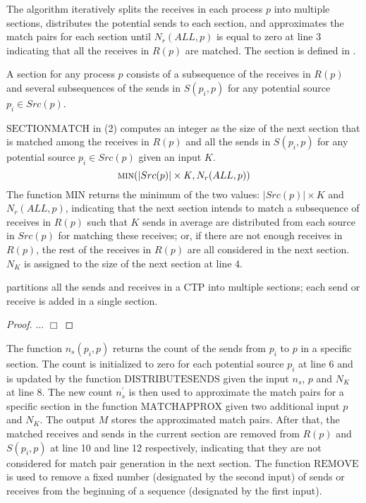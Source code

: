 The algorithm iteratively splits the receives in each process $p$ into multiple sections, distributes the potential sends to each section, and approximates the match pairs for each section until $N_r(ALL,p)$ is equal to zero at line 3 indicating that all the receives in $R(p)$ are matched.  The section is defined in .

\begin{definition}
A section for any process $p$ consists of a subsequence of the receives in $R(p)$ and several subsequences of the sends in $S(p_i,p)$ for any potential source $p_i\in Src(p)$.
\label{def:section}
\end{definition}

$\mathrm{SECTIONMATCH}$ in (2) computes an integer as the size of the next section that is matched among the receives in $R(p)$ and all the sends in $S(p_{i},p)$ for any potential source $p_{i}\in Src(p)$ 
given an input $K$. 
\begin{equation}
\Call{min}{|Src(p)|\times\mathit{K}, N_r(ALL,p)}
\end{equation}
The function $\mathrm{MIN}$ returns the minimum of the two values: $|Src(p)|\times\mathit{K}$ and $ N_r(ALL,p)$, indicating that the next section intends to match a subsequence of receives in $R(p)$ such that $K$ sends in average are distributed from each source in $Src(p)$ for matching these receives; or, if there are not enough receives in $R(p)$, the rest of the receives in $R(p)$ are all considered in the next section. $N_K$ is assigned to the size of the next section at line 4. 

\begin{lemma}
 partitions all the sends and receives in a CTP into multiple sections; each send or receive is added in a single section.
\end{lemma}
\begin{proof}
... 
$\Box$
\end{proof}

The function $\mathit{n_s}(p_{i},p)$ returns the count of the  sends from $p_i$ to $p$ in a specific section. The count is initialized to zero for each potential source $p_i$ at line 6 and is updated by the function $\mathrm{DISTRIBUTESENDS}$ given the input $n_s$, $p$ and $N_K$ at line 8. The new count $n_s^\prime$ is then used to approximate the match pairs for a specific section in the function $\mathrm{MATCHAPPROX}$ given two additional input $p$ and $N_K$.
The output $M$ stores the approximated match pairs. After that, the matched receives and sends in the current section are removed from $R(p)$ and $S(p_i,p)$ at line 10 and line 12 respectively, indicating that they are not considered for match pair generation in the next section. The function $\mathrm{REMOVE}$ is used to remove a fixed number (designated by the second input) of sends or receives from the beginning of a sequence (designated by the first input). 


